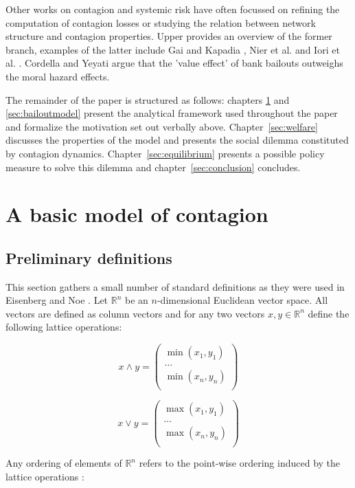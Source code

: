 \documentclass[12pt,a4paper]{article}
\begin{document}
Other works on contagion and systemic risk have often focussed on refining the computation of contagion losses or studying the relation between network structure and contagion properties. Upper \cite{Upp11} provides an overview of the former branch, examples of the latter include Gai and Kapadia \cite{Gai10}, Nier et al. \cite{Nie07} and Iori et al. \cite{Ior06}. Cordella and Yeyati \cite{Cor03} argue that the 'value effect' of bank bailouts outweighs the moral hazard effects.

The remainder of the paper is structured as follows: chapters \ref{sec:basicmodel} and \ref{sec:bailoutmodel} present the analytical framework used throughout the paper and formalize the motivation set out verbally above. Chapter~\ref{sec:welfare} discusses the properties of the model and presents the social dilemma constituted by contagion dynamics. Chapter~\ref{sec:equilibrium} presents a possible policy measure to solve this dilemma and chapter~\ref{sec:conclusion} concludes.

\section{A basic model of contagion} 
\label{sec:basicmodel}
\subsection{Preliminary definitions}

This section gathers a small number of standard definitions as they were used in Eisenberg and Noe \cite{Eis01}. Let $\mathbb{R}^n$ be an $n$-dimensional Euclidean vector space. All vectors are defined as column vectors and for any two vectors $x,y \in \mathbb{R}^n$ define the following lattice operations:

\[
x \wedge y = 
\begin{pmatrix}
\min (x_1, y_1)\\
\dots\\
\min (x_n, y_n)\\
\end{pmatrix}
\]

\[
x \vee y = 
\begin{pmatrix}
\max (x_1, y_1)\\
\dots\\
\max (x_n, y_n)\\
\end{pmatrix}
\]

Any ordering of elements of $\mathbb{R}^n$ refers to the point-wise ordering induced by the lattice operations \cite{Eis01}:
\end{document}
